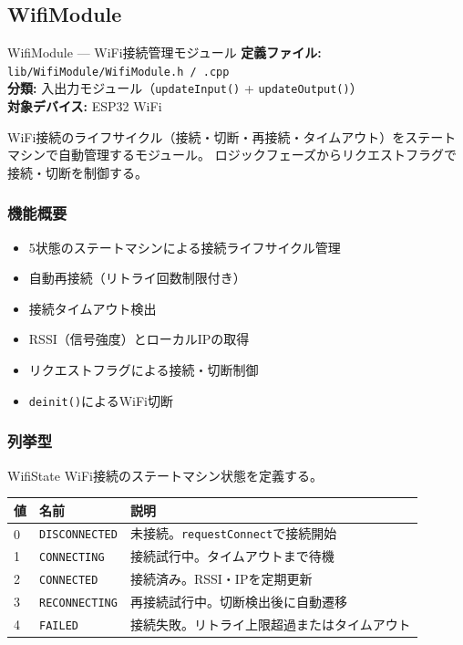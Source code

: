 \subsection{WifiModule}

\begin{apibox}{WifiModule --- WiFi接続管理モジュール}
\textbf{定義ファイル:} \texttt{lib/WifiModule/WifiModule.h / .cpp}\\
\textbf{分類:} 入出力モジュール（\texttt{updateInput()} + \texttt{updateOutput()}）\\
\textbf{対象デバイス:} ESP32 WiFi

WiFi接続のライフサイクル（接続・切断・再接続・タイムアウト）をステートマシンで自動管理するモジュール。
ロジックフェーズからリクエストフラグで接続・切断を制御する。
\end{apibox}

\subsubsection{機能概要}

\begin{itemize}
    \item 5状態のステートマシンによる接続ライフサイクル管理
    \item 自動再接続（リトライ回数制限付き）
    \item 接続タイムアウト検出
    \item RSSI（信号強度）とローカルIPの取得
    \item リクエストフラグによる接続・切断制御
    \item \texttt{deinit()}によるWiFi切断
\end{itemize}

\subsubsection{列挙型}

\begin{funcblock}{WifiState}
WiFi接続のステートマシン状態を定義する。

\begin{longtable}{l l p{6.0cm}}
\toprule
\textbf{値} & \textbf{名前} & \textbf{説明} \\
\midrule
\endhead
0 & \texttt{DISCONNECTED} & 未接続。\texttt{requestConnect}で接続開始 \\
1 & \texttt{CONNECTING}   & 接続試行中。タイムアウトまで待機 \\
2 & \texttt{CONNECTED}    & 接続済み。RSSI・IPを定期更新 \\
3 & \texttt{RECONNECTING} & 再接続試行中。切断検出後に自動遷移 \\
4 & \texttt{FAILED}       & 接続失敗。リトライ上限超過またはタイムアウト \\
\bottomrule
\end{longtable}
\end{funcblock}

